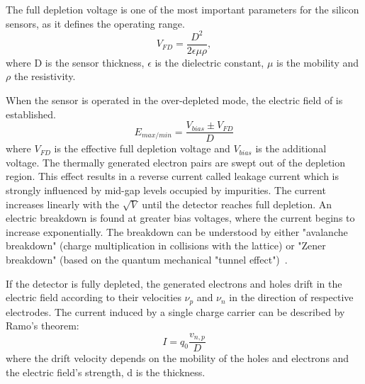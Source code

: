 The full depletion voltage is one of the most important parameters for the silicon sensors, as it defines the operating range. 
\begin{equation}
    V_{FD} = \frac{D^{2}}{2\epsilon \mu \rho},
\end{equation}
where D is the sensor thickness, $\epsilon$ is the dielectric constant, $\mu$ is the mobility and $\rho$ the resistivity.

When the sensor is operated in the over-depleted mode, the electric field of is established.
\begin{equation}
    E_{max/min} = \frac{V_{bias}\pm V_{FD}}{D}
\end{equation}
where $V_{FD}$ is the effective full depletion voltage and $V_{bias}$ is the additional voltage. The thermally generated electron pairs are swept out of the depletion region. This effect results in a reverse current called leakage current which is strongly influenced by mid-gap levels occupied by impurities. The current increases linearly with the $\sqrt{V}$ until the detector reaches full depletion. An electric breakdown is found at greater bias voltages, where the current begins to increase exponentially. The breakdown can be understood by either "avalanche breakdown" (charge multiplication in collisions with the lattice) or "Zener breakdown" (based on the quantum mechanical "tunnel effect")~\cite{Hartmann:2017gzy}.

If the detector is fully depleted, the generated electrons and holes drift in the electric field according to their velocities $\nu_{p}$ and $\nu_{n}$ in the direction of respective electrodes. The current induced by a single charge carrier can be described by Ramo's theorem:
\begin{equation}
    I = q_{0}\frac{v_{n,p}}{D}
\end{equation}
where the drift velocity depends on the mobility of the holes and electrons and the electric field's strength, d is the thickness.

